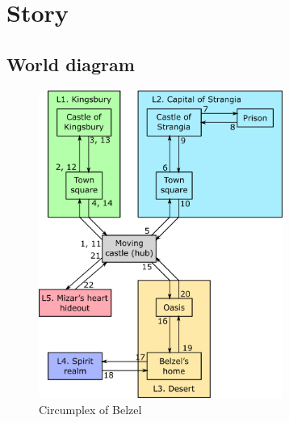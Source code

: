 \chapter{Story}






\section{World diagram}
\begin{figure}[H]
  \centering
  \includegraphics[width=8cm]{Images/worldDiagram}
  \caption{Circumplex of Belzel}
\end{figure}


